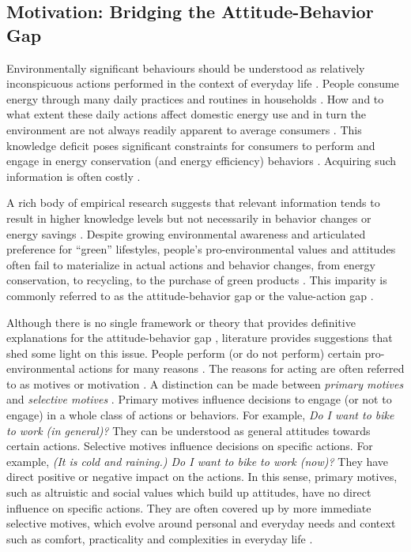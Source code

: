 \subsection{Motivation: Bridging the Attitude-Behavior Gap}

Environmentally significant behaviours should be understood as relatively inconspicuous actions performed in the context of everyday life \citep{Burgess2008}. People consume energy through many daily practices and routines in households \citep{Burgess2008,Hargreaves2010, Fehrenbacher2011,Burchell2014}. How and to what extent these daily actions affect domestic energy use and in turn the environment are not always readily apparent to average consumers  \citep{Burgess2008,Delmas2013}. This knowledge deficit poses significant constraints for consumers to perform and engage in energy conservation (and energy efficiency) behaviors \citep{Schultz2002,Burchell2014}. Acquiring such information is often costly  \citep{Delmas2013}. 

A rich body of empirical research suggests that relevant information tends to result in higher knowledge levels but not necessarily in behavior changes or energy savings  \citep{Abrahamse2005,Delmas2013,Burchell2014,Asensio2015}. Despite growing environmental awareness and articulated preference for ``green'' lifestyles, people's pro-environmental values and attitudes often fail to materialize in actual actions and behavior changes, from energy conservation, to recycling,  to the purchase of green products  \citep{Schultz2002,Abrahamse2005,Claudy2013}. This imparity is commonly referred to as the attitude-behavior gap or the value-action gap  \citep{Blake1999,Kollmuss2002,Claudy2013}. 

Although there is no single framework or theory that provides definitive explanations for the attitude-behavior gap  \citep{Kollmuss2002,Schultz2014}, literature provides suggestions that shed some light on this issue. People perform (or do not perform) certain pro-environmental actions for many reasons  \citep{Schultz2002}. The reasons for acting are often referred to as motives or motivation  \citep{Parfit1997,Moisander2007}. A distinction can be made between \textit{primary motives} and \textit{selective motives}  \citep{Kollmuss2002,Moisander2007}. Primary motives influence decisions to engage (or not to engage) in a whole class of actions or behaviors. For example, \textit{Do I want to bike to work (in general)?} They can be understood as general attitudes towards certain actions. Selective motives influence decisions on specific actions. For example, \textit{(It is cold and raining.) Do I want to bike to work (now)?} They have direct positive or negative impact on the actions. In this sense, primary motives, such as altruistic and social values which build up attitudes, have no direct influence on specific actions. They are often covered up by more immediate selective motives, which evolve around personal and everyday needs and context such as comfort, practicality and complexities in everyday life  \citep{Kollmuss2002,Berthou2013,Selvefors2015}. 

